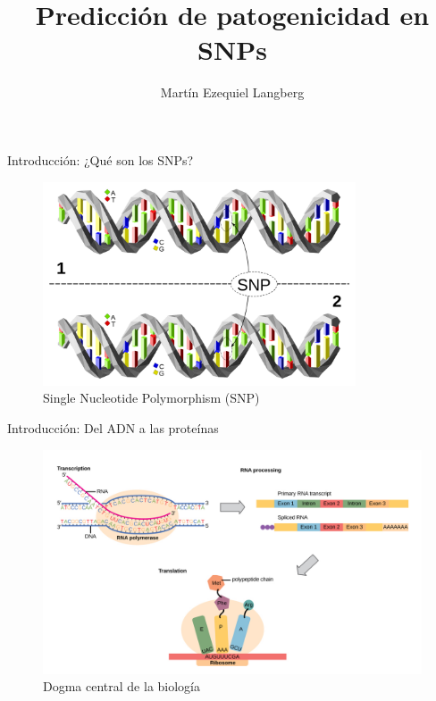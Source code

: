 \documentclass[
  spanish,
  ignorenonframetext,
]{beamer}
\title{Predicción de patogenicidad en SNPs}
\author{Martín Ezequiel Langberg}
\date{}
\begin{document}
\frame{\titlepage}

\begin{frame}{Introducción: ¿Qué son los SNPs?}
\protect\hypertarget{introducciuxf3n-quuxe9-son-los-snps}{}

\begin{figure}
\centering
\includegraphics[width=3.64583in,height=\textheight]{Dna-SNP.svg.png}
\caption{Single Nucleotide Polymorphism (SNP)}
\end{figure}

\end{frame}

\begin{frame}{Introducción: Del ADN a las proteínas}
\protect\hypertarget{introducciuxf3n-del-adn-a-las-proteuxednas}{}

\begin{figure}
\centering
\includegraphics[width=4.6875in,height=\textheight]{dogma.png}
\caption{Dogma central de la biología}
\end{figure}

\end{frame}
\end{document}
